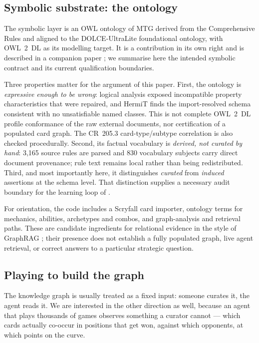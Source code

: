 \documentclass[11pt,a4paper]{article}
\theoremstyle{definition}
\theoremstyle{plain}
\begin{document}
\subsection{Symbolic substrate: the ontology}
\label{sec:ontology}

The symbolic layer is an OWL ontology of MTG derived from the Comprehensive Rules and aligned to the DOLCE-UltraLite foundational ontology, with OWL~2~DL as its modelling target. It is a contribution in its own right and is described in a companion paper \citep{neuburger2026ontology}; we summarise here the intended symbolic contract and its current qualification boundaries.

Three properties matter for the argument of this paper. First, the ontology is \emph{expressive enough to be wrong}: logical analysis exposed incompatible property characteristics that were repaired, and HermiT finds the import-resolved schema consistent with no unsatisfiable named classes. This is not complete OWL~2~DL profile conformance of the raw external documents, nor certification of a populated card graph. The CR~205.3 card-type/subtype correlation is also checked procedurally. Second, its factual vocabulary is \emph{derived, not curated by hand}: 3{,}165 source rules are parsed and 830 vocabulary subjects carry direct document provenance; rule text remains local rather than being redistributed. Third, and most importantly here, it distinguishes \emph{curated} from \emph{induced} assertions at the schema level. That distinction supplies a necessary audit boundary for the learning loop of .

For orientation, the code includes a Scryfall card importer, ontology terms for mechanics, abilities, archetypes and combos, and graph-analysis and retrieval paths. These are candidate ingredients for relational evidence in the style of GraphRAG \citep{edge2024graphrag}; their presence does not establish a fully populated graph, live agent retrieval, or correct answers to a particular strategic question.

\subsection{Playing to build the graph}
\label{sec:playtograph}

The knowledge graph is usually treated as a fixed input: someone curates it, the agent reads it. We are interested in the other direction as well, because an agent that plays thousands of games observes something a curator cannot --- which cards actually co-occur in positions that get won, against which opponents, at which points on the curve.
\end{document}

